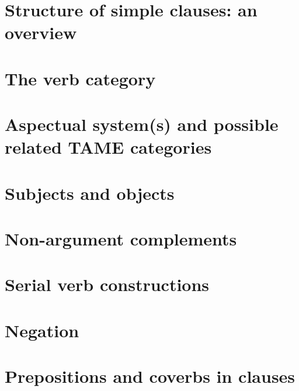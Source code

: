 \documentclass[UTF8, a4paper, oneside, scheme=plain]{ctexbook}
\numberwithin{equation}{chapter}
\begin{document}
\chapter{Structure of simple clauses: an overview}\label{chap:basic-clause-structure}



\chapter{The verb category}



\chapter{Aspectual system(s) and possible related TAME categories}\label{chap:aspect}



\chapter{Subjects and objects}\label{chap:subject-object}





\chapter{Non-argument complements}\label{chap:non-argument-complement}



\chapter{Serial verb constructions}\label{chap:serial-verb-construction} %



\chapter{Negation}\label{chap:negation}

\chapter{Prepositions and coverbs in clauses}\label{chap:coverbs}
\end{document}
